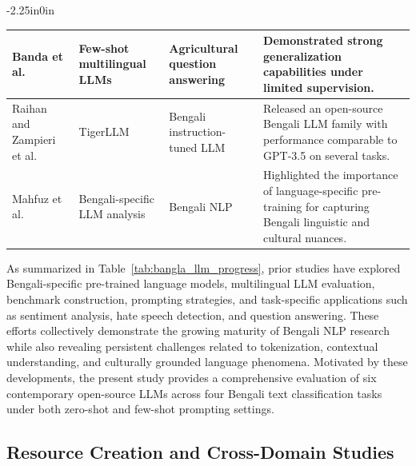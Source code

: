 \documentclass[10pt,letterpaper]{article}
\begin{document}
\begin{table}[!t]
\begin{adjustwidth}{-2.25in}{0in}
\begin{tabular}{|>{\raggedright\arraybackslash}p{3cm}|>{\raggedright\arraybackslash}p{3.0cm}|>{\raggedright\arraybackslash}p{3.0cm}|>{\raggedright\arraybackslash}p{8.1cm}|}
\hline
Banda et al.~\cite{b9} & Few-shot multilingual LLMs & Agricultural question answering & Demonstrated strong generalization capabilities under limited supervision. \\
\hline
Raihan and Zampieri et al.~\cite{b10} & TigerLLM & Bengali instruction-tuned LLM & Released an open-source Bengali LLM family with performance comparable to GPT-3.5 on several tasks. \\
\hline
Mahfuz et al.~\cite{b11} & Bengali-specific LLM analysis & Bengali NLP & Highlighted the importance of language-specific pre-training for capturing Bengali linguistic and cultural nuances. \\
\hline
\end{tabular}
\end{adjustwidth}
\end{table}

As summarized in Table~\ref{tab:bangla_llm_progress}, prior studies have explored Bengali-specific pre-trained language models, multilingual LLM evaluation, benchmark construction, prompting strategies, and task-specific applications such as sentiment analysis, hate speech detection, and question answering. These efforts collectively demonstrate the growing maturity of Bengali NLP research while also revealing persistent challenges related to tokenization, contextual understanding, and culturally grounded language phenomena. Motivated by these developments, the present study provides a comprehensive evaluation of six contemporary open-source LLMs across four Bengali text classification tasks under both zero-shot and few-shot prompting settings.



\subsection*{Resource Creation and Cross-Domain Studies}
\end{document}
